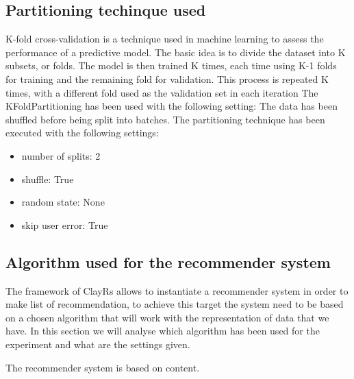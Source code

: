 \documentclass[11pt]{article}
\begin{document}
\subsection{Partitioning techinque used}\label{subsec:partitioning}
K-fold cross-validation is a technique used in machine learning to assess
the performance of a predictive model. The basic idea is to divide the dataset
into K subsets, or folds. The model is then trained K times, each time using K-1
folds for training and the remaining fold for validation. This process is
repeated K times, with a different fold used as the validation set in each iteration
\hfill\break
\hfill\break
The KFoldPartitioning has been used with the following setting:
\hfill\break
\hfill\break
The data has been shuffled before being split into batches.
The partitioning technique has been executed with the following settings:
\begin{itemize}
    \item number of splits: 2
    \item shuffle: True
    \item random state: None
    \item skip user error: True
\end{itemize}
\hfill\break
\hfill\break




\subsection{Algorithm used for the recommender system}\label{subsec:algo}
The framework of ClayRs allows to instantiate a recommender system in order to make list of recommendation, to achieve
this target the system need to be based on a chosen algorithm that will work with the representation of data that
we have.
In this section we will analyse which algorithm has been used for the experiment and what are the settings
given.
\hfill\break
\hfill\break

The recommender system is based on content.
\hfill\break
\hfill\break
\end{document}

